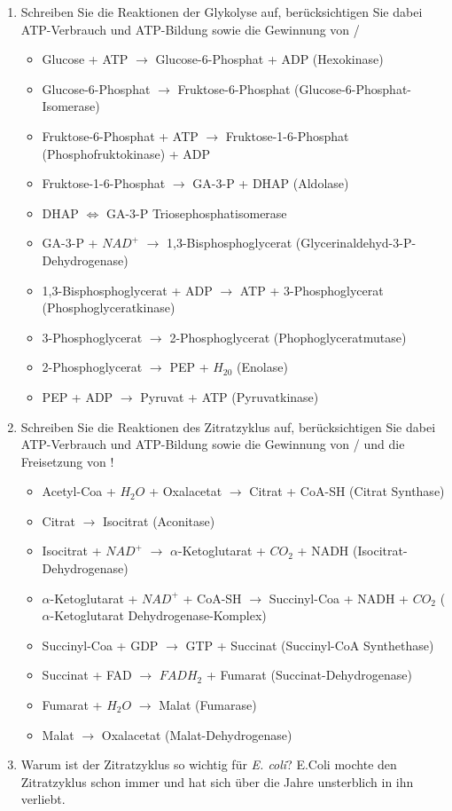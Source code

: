 \begin{enumerate}
	\item Schreiben Sie die Reaktionen der Glykolyse auf, berücksichtigen Sie dabei ATP-Verbrauch und ATP-Bildung sowie die Gewinnung von  / 
		\begin{itemize}
			\item Glucose + ATP $\rightarrow$ Glucose-6-Phosphat + ADP (Hexokinase)
			\item Glucose-6-Phosphat $\rightarrow$ Fruktose-6-Phosphat (Glucose-6-Phosphat-Isomerase)
			\item Fruktose-6-Phosphat + ATP $\rightarrow$ Fruktose-1-6-Phosphat (Phosphofruktokinase) + ADP
			\item Fruktose-1-6-Phosphat $\rightarrow$ GA-3-P + DHAP (Aldolase)
			\item DHAP $\Longleftrightarrow$ GA-3-P Triosephosphatisomerase
			\item GA-3-P + $NAD^+$ $\rightarrow$ 1,3-Bisphosphoglycerat (Glycerinaldehyd-3-P-Dehydrogenase)
			\item 1,3-Bisphosphoglycerat + ADP $\rightarrow$ ATP + 3-Phosphoglycerat (Phosphoglyceratkinase)
			\item 3-Phosphoglycerat $\rightarrow$ 2-Phosphoglycerat (Phophoglyceratmutase)
			\item 2-Phosphoglycerat $\rightarrow$ PEP + $H_20$ (Enolase)
			\item PEP + ADP $\rightarrow$ Pyruvat + ATP (Pyruvatkinase)
		\end{itemize}
	\item Schreiben Sie die Reaktionen des Zitratzyklus auf, berücksichtigen Sie dabei ATP-Verbrauch und ATP-Bildung sowie die Gewinnung von  /  und die Freisetzung von !
		\begin{itemize}
			\item Acetyl-Coa + $H_2O$ + Oxalacetat $\rightarrow$ Citrat + CoA-SH (Citrat Synthase)
			\item Citrat $\rightarrow$ Isocitrat (Aconitase)
			\item Isocitrat + $NAD^+$ $\rightarrow$ $\alpha$-Ketoglutarat + $CO_2$ + NADH (Isocitrat-Dehydrogenase)
			\item $\alpha$-Ketoglutarat + $NAD^+$ + CoA-SH $\rightarrow$ Succinyl-Coa + NADH + $CO_2$ ($\alpha$-Ketoglutarat Dehydrogenase-Komplex)
			\item Succinyl-Coa + GDP $\rightarrow$ GTP + Succinat (Succinyl-CoA Synthethase)
			\item Succinat + FAD $\rightarrow$ $FADH_2$ + Fumarat  (Succinat-Dehydrogenase)
			\item Fumarat + $H_2O$ $\rightarrow$ Malat (Fumarase)
			\item Malat $\rightarrow$ Oxalacetat (Malat-Dehydrogenase)
		\end{itemize}


	\item Warum ist der Zitratzyklus so wichtig für \emph{E. coli}?
		E.Coli mochte den Zitratzyklus schon immer und hat sich \"uber die Jahre unsterblich in ihn verliebt.
\end{enumerate}
